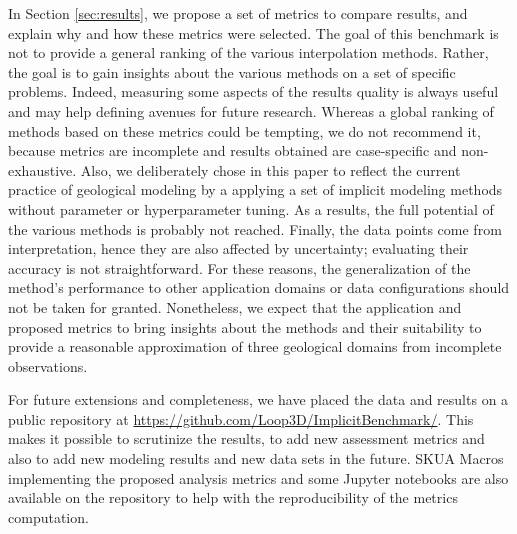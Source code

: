 \documentclass[final]{ring20}
\begin{document}
In Section \ref{sec:results}, we propose a set of metrics to compare results, and explain why and how these metrics were selected. The goal of this benchmark is not to provide a general ranking of the various interpolation methods. Rather, the goal is to gain insights about the various methods on a set of specific problems. Indeed, measuring some aspects of the results quality is always useful and may help defining avenues for future research. Whereas a global ranking of methods based on these metrics could be tempting, we do not recommend it, because metrics are incomplete and results obtained are case-specific and non-exhaustive. Also, we deliberately chose in this paper to reflect the current practice of geological modeling by a applying a set of implicit modeling methods without parameter or hyperparameter tuning. As a results, the full potential of the various methods is probably not reached. Finally, the data points come from interpretation, hence they are also affected by uncertainty; evaluating their accuracy is not straightforward. For these reasons, the generalization of the method's performance to other application domains or data configurations should not be taken for granted. Nonetheless, we expect that the application and proposed metrics to bring insights about the methods and their suitability to provide a reasonable approximation of three geological domains from incomplete observations. 

For future extensions and completeness, we have placed the data and results on a public repository at \url{https://github.com/Loop3D/ImplicitBenchmark/}. This makes it possible to scrutinize the results, to add new assessment metrics and also to add new modeling results and new data sets in the future. SKUA Macros implementing the proposed analysis metrics and some Jupyter notebooks are also available on the repository to help with the reproducibility of the metrics computation. 

\end{document}

